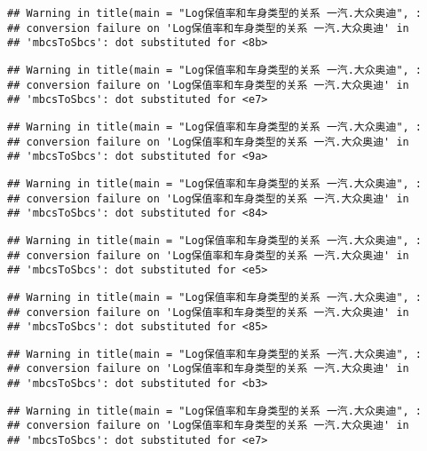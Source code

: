 \documentclass[]{article}
\begin{document}
\begin{verbatim}
## Warning in title(main = "Log保值率和车身类型的关系 一汽.大众奥迪", :
## conversion failure on 'Log保值率和车身类型的关系 一汽.大众奥迪' in
## 'mbcsToSbcs': dot substituted for <8b>
\end{verbatim}

\begin{verbatim}
## Warning in title(main = "Log保值率和车身类型的关系 一汽.大众奥迪", :
## conversion failure on 'Log保值率和车身类型的关系 一汽.大众奥迪' in
## 'mbcsToSbcs': dot substituted for <e7>
\end{verbatim}

\begin{verbatim}
## Warning in title(main = "Log保值率和车身类型的关系 一汽.大众奥迪", :
## conversion failure on 'Log保值率和车身类型的关系 一汽.大众奥迪' in
## 'mbcsToSbcs': dot substituted for <9a>
\end{verbatim}

\begin{verbatim}
## Warning in title(main = "Log保值率和车身类型的关系 一汽.大众奥迪", :
## conversion failure on 'Log保值率和车身类型的关系 一汽.大众奥迪' in
## 'mbcsToSbcs': dot substituted for <84>
\end{verbatim}

\begin{verbatim}
## Warning in title(main = "Log保值率和车身类型的关系 一汽.大众奥迪", :
## conversion failure on 'Log保值率和车身类型的关系 一汽.大众奥迪' in
## 'mbcsToSbcs': dot substituted for <e5>
\end{verbatim}

\begin{verbatim}
## Warning in title(main = "Log保值率和车身类型的关系 一汽.大众奥迪", :
## conversion failure on 'Log保值率和车身类型的关系 一汽.大众奥迪' in
## 'mbcsToSbcs': dot substituted for <85>
\end{verbatim}

\begin{verbatim}
## Warning in title(main = "Log保值率和车身类型的关系 一汽.大众奥迪", :
## conversion failure on 'Log保值率和车身类型的关系 一汽.大众奥迪' in
## 'mbcsToSbcs': dot substituted for <b3>
\end{verbatim}

\begin{verbatim}
## Warning in title(main = "Log保值率和车身类型的关系 一汽.大众奥迪", :
## conversion failure on 'Log保值率和车身类型的关系 一汽.大众奥迪' in
## 'mbcsToSbcs': dot substituted for <e7>
\end{verbatim}
\end{document}
